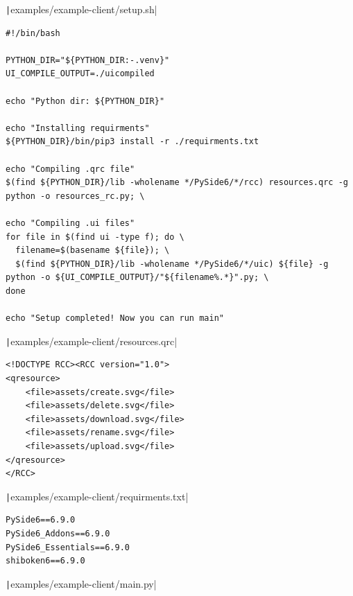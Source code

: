 \documentclass[a4paper,14pt]{extarticle}
\begin{document}
\texttt|examples/example-client/setup.sh|
\begin{verbatim}
#!/bin/bash

PYTHON_DIR="${PYTHON_DIR:-.venv}"
UI_COMPILE_OUTPUT=./uicompiled

echo "Python dir: ${PYTHON_DIR}"

echo "Installing requirments"
${PYTHON_DIR}/bin/pip3 install -r ./requirments.txt

echo "Compiling .qrc file"
$(find ${PYTHON_DIR}/lib -wholename */PySide6/*/rcc) resources.qrc -g python -o resources_rc.py; \

echo "Compiling .ui files"
for file in $(find ui -type f); do \
  filename=$(basename ${file}); \
  $(find ${PYTHON_DIR}/lib -wholename */PySide6/*/uic) ${file} -g python -o ${UI_COMPILE_OUTPUT}/"${filename%.*}".py; \
done

echo "Setup completed! Now you can run main"
\end{verbatim}
\texttt|examples/example-client/resources.qrc|
\begin{verbatim}
<!DOCTYPE RCC><RCC version="1.0">
<qresource>
    <file>assets/create.svg</file>
    <file>assets/delete.svg</file>
    <file>assets/download.svg</file>
    <file>assets/rename.svg</file>
    <file>assets/upload.svg</file>
</qresource>
</RCC>
\end{verbatim}
\texttt|examples/example-client/requirments.txt|
\begin{verbatim}
PySide6==6.9.0
PySide6_Addons==6.9.0
PySide6_Essentials==6.9.0
shiboken6==6.9.0
\end{verbatim}
\texttt|examples/example-client/main.py|
\end{document}
